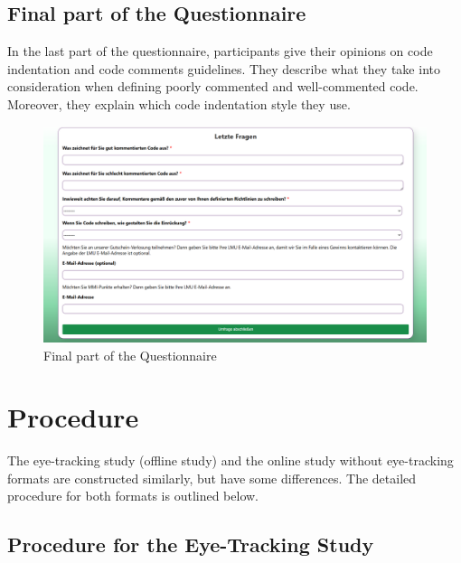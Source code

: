 \subsection{Final part of the Questionnaire}
In the last part of the questionnaire, participants give their opinions on code indentation and code comments guidelines. They describe what they take into consideration when defining poorly commented and well-commented code. Moreover, they explain which code indentation style they use.  


\begin{figure}  [H]
  \centering
  \includegraphics[scale=0.45]{figures/last_part.png}
  \caption{Final part of the Questionnaire}
  \label{fig:AnhangsChor}
\end{figure}


 
\section{Procedure}

The eye-tracking study (offline study) and the online study without eye-tracking formats are constructed similarly, but have some differences. The detailed procedure for both formats is outlined below.

\subsection{Procedure for the Eye-Tracking Study}




